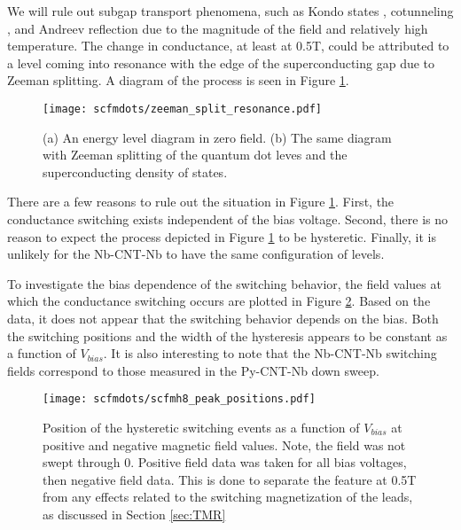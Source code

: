 We will rule out subgap transport phenomena, such as Kondo states \cite{Nygard2000, Grove-Rasmussen2007, Jarillo-Herrero2005}, cotunneling \cite{Liang2002}, and Andreev reflection \cite{Pillet2010} due to the magnitude of the field and relatively high temperature. The change in conductance, at least at 0.5T, could be attributed to a level coming into resonance with the edge of the superconducting gap due to Zeeman splitting. A diagram of the process is seen in Figure \ref{fig:zeeman_split_resonance}.

\begin{figure}
    \centering
    \texttt{[image: scfmdots/zeeman\_split\_resonance.pdf]}
    \caption{(a) An energy level diagram in zero field. (b) The same diagram with Zeeman splitting of the quantum dot leves and the superconducting density of states.}
    \label{fig:zeeman_split_resonance}
\end{figure}

There are a few reasons to rule out the situation in Figure \ref{fig:zeeman_split_resonance}. First, the conductance switching exists independent of the bias voltage. Second, there is no reason to expect the process depicted in Figure \ref{fig:zeeman_split_resonance} to be hysteretic. Finally, it is unlikely for the Nb-CNT-Nb to have the same configuration of levels.

To investigate the bias dependence of the switching behavior, the field values at which the conductance switching occurs are plotted in Figure \ref{fig:scfmh8_peak_positions}. Based on the data, it does not appear that the switching behavior depends on the bias. Both the switching positions and the width of the hysteresis appears to be constant as a function of $V_{bias}$. It is also interesting to note that the Nb-CNT-Nb switching fields correspond to those measured in the Py-CNT-Nb down sweep.

\begin{figure}
    \centering
    \texttt{[image: scfmdots/scfmh8\_peak\_positions.pdf]}
    \caption{Position of the hysteretic switching events as a function of $V_{bias}$ at positive and negative magnetic field values. Note, the field was not swept through 0. Positive field data was taken for all bias voltages, then negative field data. This is done to separate the feature at 0.5T from any effects related to the switching magnetization of the leads, as discussed in Section \ref{sec:TMR}}
    \label{fig:scfmh8_peak_positions}
\end{figure}

